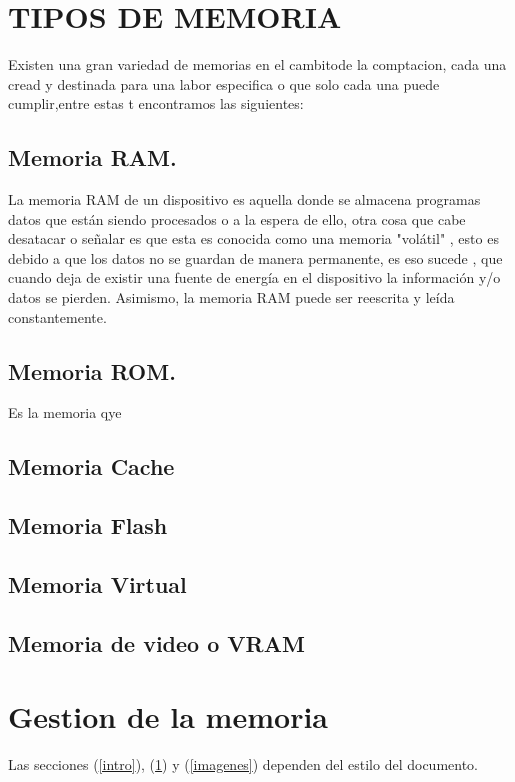 \documentclass{article}
\begin{document}
\section{TIPOS DE MEMORIA} \label{contenido}
Existen una gran variedad de memorias  en el cambitode la comptacion, cada una cread y destinada para una labor especifica o que solo cada una puede cumplir,entre estas t encontramos las siguientes:
\subsection{Memoria RAM.}
La memoria RAM  de un dispositivo  es aquella donde se almacena programas datos que están siendo procesados o a la espera de ello, otra cosa que cabe desatacar o señalar es que  esta es conocida como una  memoria "volátil" , esto es debido a que los datos no se guardan de manera permanente, es eso sucede , que cuando deja de existir una fuente de energía en el dispositivo la información y/o datos se pierden. Asimismo, la memoria RAM puede ser reescrita y leída constantemente.

\subsection{Memoria ROM.}
Es la memoria qye
\subsection {Memoria Cache}
\subsection{Memoria Flash}
\subsection{Memoria Virtual}
\subsection{Memoria de video o VRAM}


\section{Gestion de la memoria} 
Las secciones (\ref{intro}), (\ref{contenido}) y (\ref{imagenes}) dependen del estilo del documento.



\end{document}
